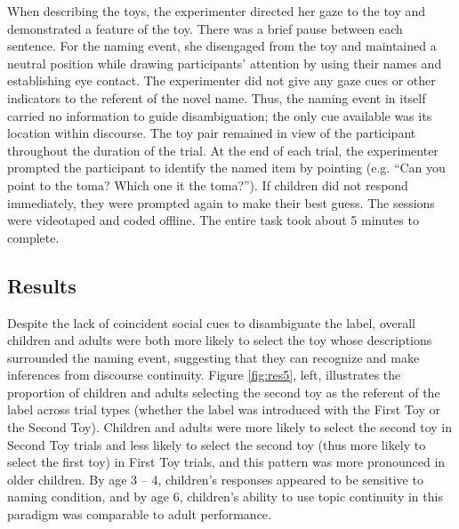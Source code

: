 \documentclass[man]{apa2}
\begin{document}
When describing the toys, the experimenter directed her gaze to the toy and demonstrated a feature of the toy.  There was a brief pause between each sentence.  For the naming event, she disengaged from the toy and maintained a neutral position while drawing participants' attention by using their names and establishing eye contact.  The experimenter did not give any gaze cues or other indicators to the referent of the novel name.  Thus, the naming event in itself carried no information to guide disambiguation; the only cue available was its location within discourse.  The toy pair remained in view of the participant throughout the duration of the trial.  At the end of each trial, the experimenter prompted the participant to identify the named item by pointing (e.g. ``Can you point to the toma? Which one it the toma?'').  If children did not respond immediately, they were prompted again to make their best guess. The sessions were videotaped and coded offline. The entire task took about 5 minutes to complete. 


 

\subsection{Results}

Despite the lack of coincident social cues to disambiguate the label, overall children and adults were both more likely to select the toy whose descriptions surrounded the naming event, suggesting that they can recognize and make inferences from discourse continuity.  Figure \ref{fig:res5}, left, illustrates the proportion of children and adults selecting the second toy as the referent of the label across trial types (whether the label was introduced with the First Toy or the Second Toy).  Children and adults were more likely to select the second toy in Second Toy trials and less likely to select the second toy (thus more likely to select the first toy) in First Toy trials, and this pattern was more pronounced in older children. By age 3 -- 4, children's responses appeared to be sensitive to naming condition, and by age 6, children's ability to use topic continuity in this paradigm was comparable to adult performance.
\end{document}
